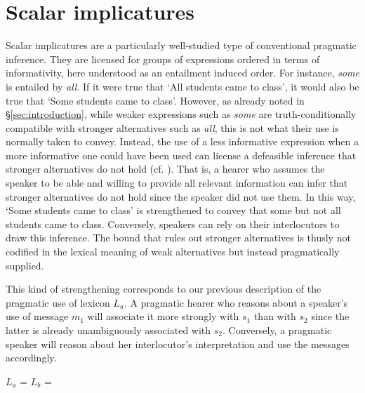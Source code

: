 \documentclass[a4paper]{article}
\begin{document}
\section{Scalar implicatures}\label{sec:si-case-study}
%
Scalar implicatures are a particularly well-studied type of conventional pragmatic inference. They are licensed for groups of expressions ordered in terms of informativity, here understood as an entailment induced order. For instance, {\em some} is entailed by {\em all}. If it were true that `All students came to class', it would also be true that `Some students came to class'. However, as already noted in \S\ref{sec:introduction}, while weaker expressions such as {\em some} are truth-conditionally compatible with stronger alternatives such as {\em all}, this is not what their use is normally taken to convey. Instead, the use of a less informative expression when a more informative one could have been used can license a defeasible inference that stronger alternatives do not hold (cf. \citealt{horn:1972,gazdar:1979}). That is, a hearer who assumes the speaker to be able and willing to provide all relevant information can infer that stronger alternatives do not hold since the speaker did not use them. In this way, `Some students came to class' is strengthened to convey that some but not all students came to class. Conversely, speakers can rely on their interlocutors to draw this inference. The bound that rules out stronger alternatives is thusly not codified in the lexical meaning of weak alternatives but instead pragmatically supplied.

This kind of strengthening corresponds to our previous description of the pragmatic use of lexicon $L_a$. A pragmatic hearer who reasons about a speaker's use of message $m_1$ will associate it more strongly with $s_1$ than with $s_2$ since the latter is already unambiguously associated with $s_2$. Conversely, a pragmatic speaker will reason about her interlocutor's interpretation and use the messages accordingly. 

\begin{centering}
$L_a$ =  \hspace{2cm} $L_b$ = \\[0.5cm]
\end{centering}
\end{document}
